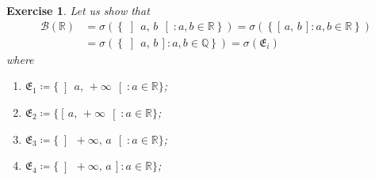 \documentclass[12pt,a4paper]{article} %
\theoremstyle{plain}
\newtheorem{exercise}{Exercise}
\newcommand\E{\ensuremath{\mathfrak E}}                               %
\newcommand\Q{\ensuremath{\mathbb Q}}                                 %
\newcommand\st{\colon}                                                %
\newcommand\icc[2]{\ensuremath{\left[\,#1,\,#2\,\right]}}
\newcommand\ico[2]{\ensuremath{\left[\,#1,\,#2\,\right[}}
\newcommand\ioc[2]{\ensuremath{\left]\,#1,\,#2\,\right]}}
\newcommand\ioo[2]{\ensuremath{\left]\,#1,\,#2\,\right[}}
\begin{document}
\begin{exercise}
  Let us show that
  \begin{subequations}
    \begin{align}    
      \mathcal{B} (\mathbb{R}) & = \sigma \left(\left\{ \ioo{a}{b} \st a, b \in \mathbb{R} \right\} \right) = \sigma \left(\left\{\icc{a}{b} \st a, b \in \mathbb{R} \right\}\right) \\
      & = \sigma \left(\left\{\ioc{a}{b} \st a, b \in \Q \right\}\right) = \sigma (\E_i)
    \end{align}
  \end{subequations}
  where
  \begin{enumerate}
    \item $\E_{1}\coloneqq \{\ioo{a}{+\infty} \st a \in \mathbb{R}\}$;
    \item $\E_{2}\coloneqq \{\ico{a}{+\infty} \st a \in \mathbb{R}\}$;
    \item $\E_{3}\coloneqq \{\ioo{+\infty}{a} \st a \in \mathbb{R}\}$;
    \item $\E_{4}\coloneqq \{\ioc{+\infty}{a} \st a \in \mathbb{R}\}$;
  \end{enumerate}
\end{exercise}
\end{document}
